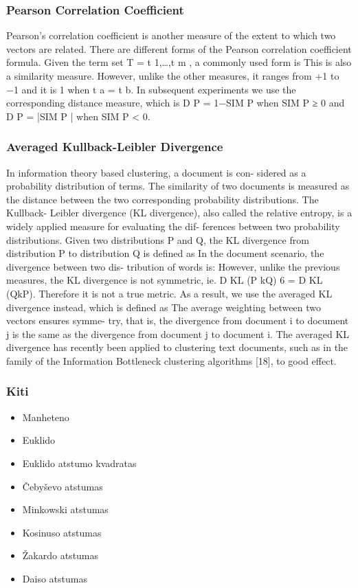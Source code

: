 \documentclass{VUMIFInfKursinis}
\begin{document}
		\subsubsection{Pearson Correlation Coefficient}
			Pearson’s correlation coefficient is another measure of the extent to which two vectors are related. There are different forms of the Pearson correlation coefficient formula. Given the term set T = {t 1,\ldots,t m }, a commonly used form is
			This is also a similarity measure. However, unlike the other measures, it ranges from +1 to −1 and it is 1 when t a = t b. In subsequent experiments we use the corresponding distance measure, which is D P = 1−SIM P when SIM P ≥ 0 and D P = |SIM P | when SIM P < 0.

		\subsubsection{Averaged Kullback-Leibler Divergence}
			In information theory based clustering, a document is con- sidered as a probability distribution of terms. The similarity of two documents is measured as the distance between the two corresponding probability distributions. The Kullback- Leibler divergence (KL divergence), also called the relative entropy, is a widely applied measure for evaluating the dif- ferences between two probability distributions.  
			Given two distributions P and Q, the KL divergence from distribution P to distribution Q is defined as
			In the document scenario, the divergence between two dis-
			tribution of words is:
			However, unlike the previous measures, the KL divergence is not symmetric, ie. D KL (P kQ) 6 = D KL (QkP). Therefore it is not a true metric. As a result, we use the averaged KL divergence instead, which is defined as
			The average weighting between two vectors ensures symme- try, that is, the divergence from document i to document j is the same as the divergence from document j to document i. The averaged KL divergence has recently been applied to clustering text documents, such as in the family of the Information Bottleneck clustering algorithms [18], to good effect.

		\subsubsection{Kiti}
		\begin{itemize}
			\item Manheteno
			\item Euklido
			\item Euklido atstumo kvadratas
			\item Čebyševo atstumas 
			\item Minkowski atstumas 
			\item Kosinuso atstumas 
			\item Žakardo atstumas 
			\item Daiso atstumas 
		\end{itemize}
\end{document}
